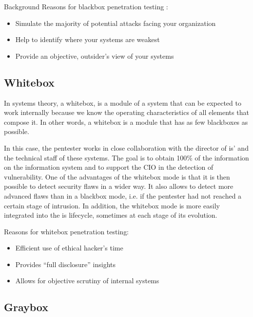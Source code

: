 \begin{chaptercover}{Background}
Reasons for blackbox penetration testing :

\begin{itemize} \vspace{-.2cm}
  \item[\checkmark] Simulate the majority of potential attacks facing your organization
  \item[\checkmark] Help to identify where your systems are weakest
  \item[\checkmark] Provide an objective, outsider's view of your systems
\end{itemize}

\subsection{Whitebox}

In systems theory, a whitebox, is a module of a system that can be expected to work internally because we know the operating characteristics of all elements that compose it. In other words, a whitebox is a module that has as few blackboxes as possible.

In this case, the pentester works in close collaboration with the director of \acrshort{is}' and the technical staff of these systems. The goal is to obtain 100\% of the information on the information system and to support the CIO in the detection of vulnerability. One of the advantages of the whitebox mode is that it is then possible to detect security flaws in a wider way. It also allows to detect more advanced flaws than in a blackbox mode, i.e. if the pentester had not reached a certain stage of intrusion. In addition, the whitebox mode is more easily integrated into the \acrshort{is} lifecycle, sometimes at each stage of its evolution.

Reasons for whitebox penetration testing:
\begin{itemize} \vspace{-.2cm}
  \item[\checkmark] Efficient use of ethical hacker's time
  \item[\checkmark] Provides “full disclosure” insights
  \item[\checkmark] Allows for objective scrutiny of internal systems
\end{itemize}

\subsection{Graybox}


\end{chaptercover}

